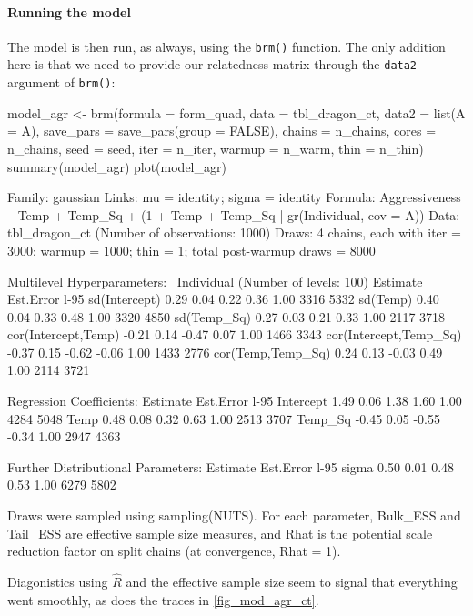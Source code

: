 \documentclass[a4paper,12pt,twoside]{article}
\begin{document}
\paragraph{Running the model}
The model is then run, as always, using the \texttt{brm()} function. The only addition here is that we need to provide our relatedness matrix through the \texttt{data2} argument of \texttt{brm()}:
\begin{Rinput}
model_agr <-
        brm(formula   = form_quad,
            data      = tbl_dragon_ct,
            data2     = list(A = A),
            save_pars = save_pars(group = FALSE),
            chains    = n_chains,
            cores     = n_chains,
            seed      = seed,
            iter      = n_iter,
            warmup    = n_warm,
            thin      = n_thin)
summary(model_agr)
plot(model_agr)
\end{Rinput}
\begin{Routput}
 Family: gaussian 
  Links: mu = identity; sigma = identity 
Formula: Aggressiveness ~ Temp + Temp_Sq + (1 + Temp + Temp_Sq | gr(Individual, cov = A)) 
   Data: tbl_dragon_ct (Number of observations: 1000) 
  Draws: 4 chains, each with iter = 3000; warmup = 1000; thin = 1;
         total post-warmup draws = 8000

Multilevel Hyperparameters:
~Individual (Number of levels: 100) 
                       Estimate Est.Error l-95%
sd(Intercept)              0.29      0.04     0.22     0.36 1.00     3316     5332
sd(Temp)                   0.40      0.04     0.33     0.48 1.00     3320     4850
sd(Temp_Sq)                0.27      0.03     0.21     0.33 1.00     2117     3718
cor(Intercept,Temp)       -0.21      0.14    -0.47     0.07 1.00     1466     3343
cor(Intercept,Temp_Sq)    -0.37      0.15    -0.62    -0.06 1.00     1433     2776
cor(Temp,Temp_Sq)          0.24      0.13    -0.03     0.49 1.00     2114     3721

Regression Coefficients:
          Estimate Est.Error l-95%
Intercept     1.49      0.06     1.38     1.60 1.00     4284     5048
Temp          0.48      0.08     0.32     0.63 1.00     2513     3707
Temp_Sq      -0.45      0.05    -0.55    -0.34 1.00     2947     4363

Further Distributional Parameters:
      Estimate Est.Error l-95%
sigma     0.50      0.01     0.48     0.53 1.00     6279     5802

Draws were sampled using sampling(NUTS). For each parameter, Bulk_ESS
and Tail_ESS are effective sample size measures, and Rhat is the potential
scale reduction factor on split chains (at convergence, Rhat = 1).
\end{Routput}
Diagonistics using $\hat{R}$ and the effective sample size seem to signal that everything went smoothly, as does the traces in \autoref{fig_mod_agr_ct}.
\end{document}
